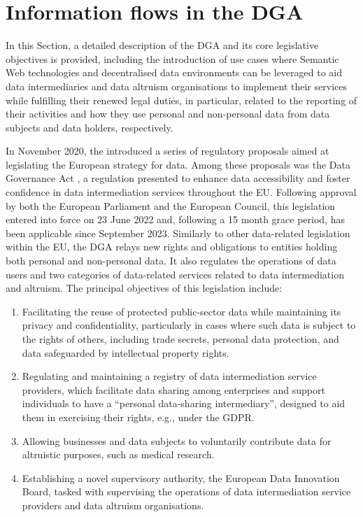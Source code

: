 \section{Information flows in the DGA}
\label{sec:dga_flows}

In this Section, a detailed description of the DGA and its core legislative objectives is provided, including the introduction of use cases where Semantic Web technologies and decentralised data environments can be leveraged to aid data intermediaries and data altruism organisations to implement their services while fulfilling their renewed legal duties, in particular, related to the reporting of their activities and how they use personal and non-personal data from data subjects and data holders, respectively.

In November 2020, the \cite{european_commission_communication_2020} introduced a series of regulatory proposals aimed at legislating the European strategy for data.
Among these proposals was the Data Governance Act \citeyearpar{noauthor_regulation_2022}, a regulation presented to enhance data accessibility and foster confidence in data intermediation services throughout the EU.
Following approval by both the European Parliament and the European Council, this legislation entered into force on 23 June 2022 and, following a 15 month grace period, has been applicable since September 2023.
Similarly to other data-related legislation within the EU, the DGA relays new rights and obligations to entities holding both personal and non-personal data.
It also regulates the operations of data users and two categories of data-related services related to data intermediation and altruism.
The principal objectives of this legislation include:
\begin{enumerate}
    \item Facilitating the reuse of protected public-sector data while maintaining its privacy and confidentiality, particularly in cases where such data is subject to the rights of others, including trade secrets, personal data protection, and data safeguarded by intellectual property rights.
    \item Regulating and maintaining a registry of data intermediation service providers, which facilitate data sharing among enterprises and support individuals to have a ``personal data-sharing intermediary'', designed to aid them in exercising their rights, e.g., under the GDPR.
    \item Allowing businesses and data subjects to voluntarily contribute data for altruistic purposes, such as medical research.
    \item Establishing a novel supervisory authority, the European Data Innovation Board, tasked with supervising the operations of data intermediation service providers and data altruism organisations.
\end{enumerate}



